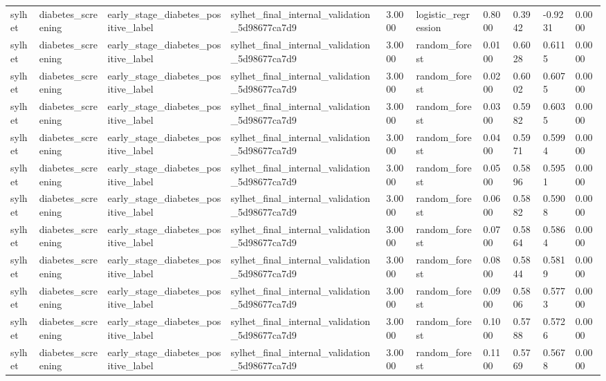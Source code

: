 \begin{tabular}{llllllllll}
sylhet & diabetes\_screening & early\_stage\_diabetes\_positive\_label & sylhet\_final\_internal\_validation\_5d98677ca7d9 & 3.0000 & logistic\_regression & 0.8000 & 0.3942 & -0.9231 & 0.0000 \\
sylhet & diabetes\_screening & early\_stage\_diabetes\_positive\_label & sylhet\_final\_internal\_validation\_5d98677ca7d9 & 3.0000 & random\_forest & 0.0100 & 0.6028 & 0.6115 & 0.0000 \\
sylhet & diabetes\_screening & early\_stage\_diabetes\_positive\_label & sylhet\_final\_internal\_validation\_5d98677ca7d9 & 3.0000 & random\_forest & 0.0200 & 0.6002 & 0.6075 & 0.0000 \\
sylhet & diabetes\_screening & early\_stage\_diabetes\_positive\_label & sylhet\_final\_internal\_validation\_5d98677ca7d9 & 3.0000 & random\_forest & 0.0300 & 0.5982 & 0.6035 & 0.0000 \\
sylhet & diabetes\_screening & early\_stage\_diabetes\_positive\_label & sylhet\_final\_internal\_validation\_5d98677ca7d9 & 3.0000 & random\_forest & 0.0400 & 0.5971 & 0.5994 & 0.0000 \\
sylhet & diabetes\_screening & early\_stage\_diabetes\_positive\_label & sylhet\_final\_internal\_validation\_5d98677ca7d9 & 3.0000 & random\_forest & 0.0500 & 0.5896 & 0.5951 & 0.0000 \\
sylhet & diabetes\_screening & early\_stage\_diabetes\_positive\_label & sylhet\_final\_internal\_validation\_5d98677ca7d9 & 3.0000 & random\_forest & 0.0600 & 0.5882 & 0.5908 & 0.0000 \\
sylhet & diabetes\_screening & early\_stage\_diabetes\_positive\_label & sylhet\_final\_internal\_validation\_5d98677ca7d9 & 3.0000 & random\_forest & 0.0700 & 0.5864 & 0.5864 & 0.0000 \\
sylhet & diabetes\_screening & early\_stage\_diabetes\_positive\_label & sylhet\_final\_internal\_validation\_5d98677ca7d9 & 3.0000 & random\_forest & 0.0800 & 0.5844 & 0.5819 & 0.0000 \\
sylhet & diabetes\_screening & early\_stage\_diabetes\_positive\_label & sylhet\_final\_internal\_validation\_5d98677ca7d9 & 3.0000 & random\_forest & 0.0900 & 0.5806 & 0.5773 & 0.0000 \\
sylhet & diabetes\_screening & early\_stage\_diabetes\_positive\_label & sylhet\_final\_internal\_validation\_5d98677ca7d9 & 3.0000 & random\_forest & 0.1000 & 0.5788 & 0.5726 & 0.0000 \\
sylhet & diabetes\_screening & early\_stage\_diabetes\_positive\_label & sylhet\_final\_internal\_validation\_5d98677ca7d9 & 3.0000 & random\_forest & 0.1100 & 0.5769 & 0.5678 & 0.0000 \\

\end{tabular}
